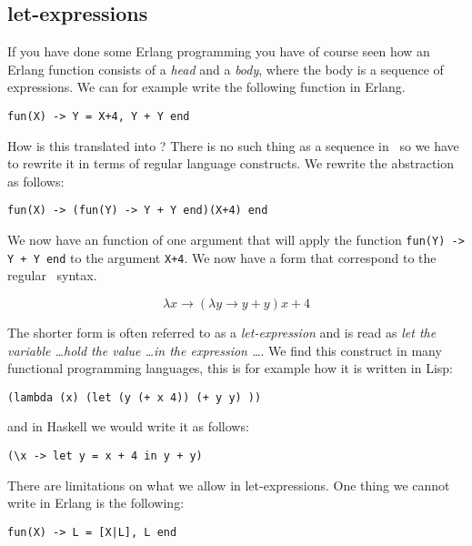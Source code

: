 \documentclass[a4paper,11pt]{article}
\begin{document}
\subsection{let-expressions}   

If you have done some Erlang programming you have of course seen how
an Erlang function consists of a {\em head} and a {\em body}, where the
body is a sequence of expressions. We can for example write the
following function in Erlang.

\vspace{10pt}
\begin{center}{\tt fun(X) ->  Y = X+4, Y + Y end}
\end{center}
\vspace{10pt}

How is this translated into \lamc? There is no such thing as a sequence
in \lamc\ so we have to rewrite it in terms of regular language
constructs. We rewrite the abstraction as follows:

\vspace{10pt}
\begin{center}{\tt fun(X) -> (fun(Y) -> Y + Y end)(X+4) end}
\end{center}
\vspace{10pt}

We now have an function of one argument that will apply the
function {\tt fun(Y) -> Y + Y end} to the argument {\tt X+4}.  We
now have a form that correspond to the regular \lamc\ syntax.

$$\lambda x \rightarrow (\lambda y \rightarrow y + y) x+4$$

The shorter form is often referred to as a {\em let-expression} and is
read as {\em let the variable \ldots hold the value \ldots in the
  expression \ldots}. We find this construct in many functional
programming languages, this is for example how it is written in Lisp:
\begin{center}{\tt  (lambda (x) (let (y (+ x 4))  (+ y y) ))}
\end{center}
and in Haskell we would write it as follows:
\begin{center}{\tt  (\textbackslash x  -> let  y = x + 4  in  y + y)}
\end{center}

There are limitations on what we allow in let-expressions. One
thing we cannot write in Erlang is the following:

\begin{center}{\tt fun(X) -> L = [X|L],  L end}
\end{center}
\end{document}
